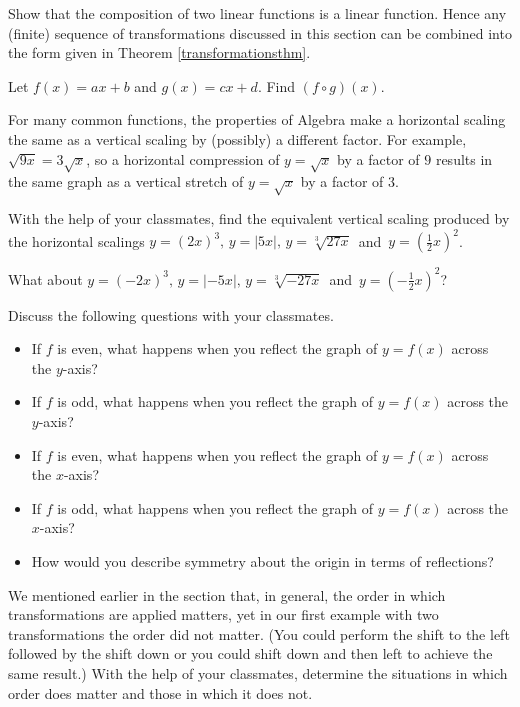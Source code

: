 \documentclass{ximera}
\begin{document}
\begin{problem}\label{CompLinearisLinearExercise}
Show that the composition of two linear functions is  a linear function. Hence any (finite) sequence of transformations discussed in this section can be combined into the form given in Theorem \ref{transformationsthm}.

\begin{hint}
Let $f(x) = ax +b$ and $g(x) = cx + d$.  Find $(f \circ g)(x)$.
\end{hint}
\end{problem}

\begin{problem}
For many common functions, the properties of Algebra make a horizontal scaling the same as a vertical scaling by (possibly) a different factor.  For example,  $\sqrt{9x} = 3\sqrt{x}$, so a horizontal compression of $y = \sqrt{x}$ by a factor of $9$ results in the same graph as a vertical stretch of $y = \sqrt{x}$ by a factor of $3$.  

With the help of your classmates, find the equivalent vertical scaling produced by the horizontal scalings $y = (2x)^{3}, \, y = |5x|, \, y = \sqrt[3]{27x} \, $ and $\, y = \left(\frac{1}{2} x\right)^{2}$.  

What about $y = (-2x)^{3}, \, y = |-5x|, \, y = \sqrt[3]{-27x}\, $ and $\, y = \left(-\frac{1}{2} x\right)^{2}$?
\end{problem}

\begin{problem}\label{SymmetryandReflectionsExercise}
Discuss the following questions with your classmates.

\begin{itemize}
\item If $f$ is even, what happens when you reflect the graph of $y = f(x)$ across the $y$-axis? 
\item If $f$ is odd, what happens when you reflect the graph of $y = f(x)$ across the $y$-axis? 
\item  If $f$ is even, what happens when you reflect the graph of $y = f(x)$ across the $x$-axis? 
\item  If $f$ is odd, what happens when you reflect the graph of $y = f(x)$ across the $x$-axis?  
\item How would you describe symmetry about the origin in terms of reflections?
\end{itemize}
\end{problem}

\begin{problem}
We mentioned earlier in the section that, in general, the order in which transformations are applied matters, yet in our first example with two transformations the order did not matter. (You could perform the shift to the left followed by the shift down or you could shift down and then left to achieve the same result.)  With the help of your classmates, determine the situations in which order does matter and those in which it does not.
\end{problem}
\end{document}
